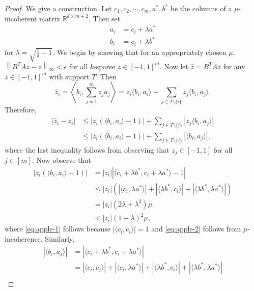 \documentclass[11pt]{article}
\newcommand{\RR}{\mathbb{R}}
\newcommand{\norm}[1]{\left\|#1\right\|}
\begin{document}
\begin{proof}
    We give a construction. Let $c_1,c_2,\cdots,c_m,a^*,b^*$ be the columns of a $\mu$-incoherent matrix $\RR^{d\times m+2}$. Then set
    \begin{align}
        a_i &= c_i + \lambda a^*\\
        b_i &= c_i + \lambda b^*
    \end{align}
    for $\lambda = \sqrt{\frac{1}{\delta} - 1}.$
    We begin by showing that for an appropriately chosen $\mu$, $\norm{B^TAz - z}_\infty < \epsilon$ for all $k$-sparse $z\in [-1,1]^m.$ Now let $\hat{z} = B^TAz$ for any $z\in [-1,1]^m$ with support $T$. Then
    \begin{equation}
        \hat{z}_i = \left\langle b_i, \sum_{j=1}^m z_ja_j \right\rangle
        = z_i\langle b_i, a_i\rangle + \sum_{j\in T\setminus \{i\}} z_j\langle b_i, a_j\rangle.
    \end{equation}
    Therefore,
    \begin{align}
        |\hat{z}_i - z_i| &\le |z_i(\langle b_i, a_i\rangle - 1)| + \sum_{j\in T\setminus \{i\}} |z_j\langle b_i, a_j\rangle|\\
        &\le |z_i(\langle b_i, a_i \rangle - 1)| + \sum_{j\in T\setminus \{i\}} |\langle b_i, a_j\rangle|,
    \end{align}
    where the last inequality follows from observing that $z_j \in [-1,1]$ for all $j\in [m].$ Now observe that
    \begin{align}
        |z_i(\langle b_i, a_i\rangle - 1)| &= |z_i||\langle c_i + \lambda b^*, c_i + \lambda a^*\rangle - 1|\\
        &\le |z_i|\left(|\langle c_i, \lambda a^*\rangle| + |\langle \lambda b^*, c_i \rangle| + |\langle \lambda b^*, \lambda a^* \rangle|\right) \label{eq:apple-1}\\
        &= |z_i|(2\lambda  + \lambda^2)\mu\label{eq:apple-2}\\
        &< |z_i|(1 + \lambda)^2\mu,
    \end{align}
    where \eqref{eq:apple-1} follows because $|\langle c_i, c_i \rangle| = 1$ and \eqref{eq:apple-2} follows from $\mu$-incoherence. Similarly,
    \begin{align}
        |\langle b_i, a_j\rangle| &= |\langle c_i + \lambda b^*, c_i + \lambda a^*\rangle|\\
        &= |\langle c_i, c_j\rangle| + |\langle c_i, \lambda a^*\rangle| + |\langle \lambda b^*, c_i \rangle| + |\langle \lambda b^*, \lambda a^* \rangle|\\

\end{align}
\end{proof}
\end{document}
